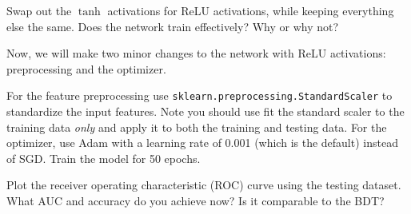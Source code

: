 \begin{problem}[5]
Swap out the $\tanh$ activations for ReLU activations, while keeping everything else the same.
Does the network train effectively?
Why or why not?
\end{problem}

\begin{problem}[5]
Now, we will make two minor changes to the network with ReLU activations: preprocessing and the optimizer.

For the feature preprocessing use \texttt{sklearn.preprocessing.StandardScaler} to standardize the input features.
Note you should use fit the standard scaler to the training data \emph{only} and apply it to both the training and testing data.
For the optimizer, use Adam with a learning rate of 0.001 (which is the default) instead of SGD. Train the model for 50 epochs.

Plot the receiver operating characteristic (ROC) curve using the testing dataset.
What AUC and accuracy do you achieve now?
Is it comparable to the BDT?
\end{problem}




